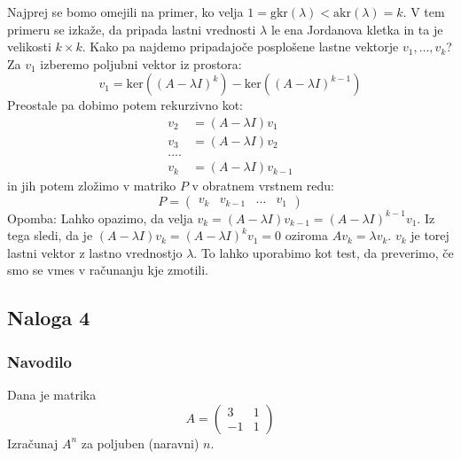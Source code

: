 \documentclass{article}
\begin{document}
\noindent Najprej se bomo omejili na primer, ko velja $1 = \mathrm{gkr}(\lambda) < \mathrm{akr}(\lambda) = k$. V tem primeru se izkaže, da pripada lastni vrednosti $\lambda$ le ena Jordanova kletka in ta je velikosti $k \times k$.
Kako pa najdemo pripadajoče posplošene lastne vektorje $v_1, \dots, v_k$?
Za $v_1$  izberemo poljubni vektor iz prostora:
\begin{equation*}
v_1 = \mathrm{ker}((A-\lambda I)^k) - \mathrm{ker}((A-\lambda I)^{k-1})
\end{equation*}
Preostale pa dobimo potem rekurzivno kot:
\begin{align*}
v_2 &= (A-\lambda I) v_1 \\
v_3 &= (A-\lambda I)v_2 \\
....& \\
v_k &= (A-\lambda I) v_{k-1}
\end{align*}
in jih potem zložimo v matriko $P$ v obratnem vrstnem redu:
\begin{equation*}
P = 
\begin{pmatrix}
v_k & v_{k-1} & \dots & v_1 
\end{pmatrix}
\end{equation*}
Opomba: Lahko opazimo, da velja $v_k = (A-\lambda I) v_{k-1} = (A-\lambda I)^{k-1} v_1$. Iz tega sledi, da je 
$(A-\lambda I) v_k = (A-\lambda I)^k v_1 = 0$ oziroma $A v_k = \lambda v_k$. $v_k$ je torej lastni vektor z lastno vrednostjo $\lambda$. To lahko uporabimo kot test, da preverimo, če smo se vmes v računanju kje zmotili.

\subsection*{Naloga 4}
\subsubsection*{Navodilo}
Dana je matrika 
\begin{equation*}
A = \begin{pmatrix}
3 & 1 \\
-1  & 1
\end{pmatrix}
\end{equation*}
Izračunaj $A^n$ za poljuben (naravni) $n$.
\end{document}
